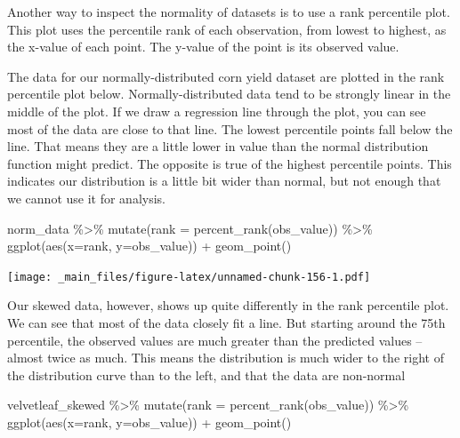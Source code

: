 \documentclass[
]{book}
\newenvironment{Shaded}{\begin{snugshade}}{\end{snugshade}}
\newcommand{\AttributeTok}[1]{\textcolor[rgb]{0.77,0.63,0.00}{#1}}
\newcommand{\FunctionTok}[1]{\textcolor[rgb]{0.00,0.00,0.00}{#1}}
\newcommand{\NormalTok}[1]{#1}
\newcommand{\SpecialCharTok}[1]{\textcolor[rgb]{0.00,0.00,0.00}{#1}}
\begin{document}
Another way to inspect the normality of datasets is to use a rank percentile plot. This plot uses the percentile rank of each observation, from lowest to highest, as the x-value of each point. The y-value of the point is its observed value.

The data for our normally-distributed corn yield dataset are plotted in the rank percentile plot below. Normally-distributed data tend to be strongly linear in the middle of the plot. If we draw a regression line through the plot, you can see most of the data are close to that line. The lowest percentile points fall below the line. That means they are a little lower in value than the normal distribution function might predict. The opposite is true of the highest percentile points. This indicates our distribution is a little bit wider than normal, but not enough that we cannot use it for analysis.

\begin{Shaded}
\begin{Highlighting}[]
\NormalTok{norm\_data }\SpecialCharTok{\%\textgreater{}\%}
  \FunctionTok{mutate}\NormalTok{(}\AttributeTok{rank =} \FunctionTok{percent\_rank}\NormalTok{(obs\_value)) }\SpecialCharTok{\%\textgreater{}\%}
  \FunctionTok{ggplot}\NormalTok{(}\FunctionTok{aes}\NormalTok{(}\AttributeTok{x=}\NormalTok{rank, }\AttributeTok{y=}\NormalTok{obs\_value)) }\SpecialCharTok{+}
  \FunctionTok{geom\_point}\NormalTok{()}
\end{Highlighting}
\end{Shaded}

\texttt{[image: \_main\_files/figure-latex/unnamed-chunk-156-1.pdf]}

Our skewed data, however, shows up quite differently in the rank percentile plot. We can see that most of the data closely fit a line. But starting around the 75th percentile, the observed values are much greater than the predicted values -- almost twice as much. This means the distribution is much wider to the right of the distribution curve than to the left, and that the data are non-normal

\begin{Shaded}
\begin{Highlighting}[]
\NormalTok{velvetleaf\_skewed }\SpecialCharTok{\%\textgreater{}\%}
        \FunctionTok{mutate}\NormalTok{(}\AttributeTok{rank =} \FunctionTok{percent\_rank}\NormalTok{(obs\_value)) }\SpecialCharTok{\%\textgreater{}\%}
        \FunctionTok{ggplot}\NormalTok{(}\FunctionTok{aes}\NormalTok{(}\AttributeTok{x=}\NormalTok{rank, }\AttributeTok{y=}\NormalTok{obs\_value)) }\SpecialCharTok{+}
        \FunctionTok{geom\_point}\NormalTok{() }
\end{Highlighting}
\end{Shaded}
\end{document}
